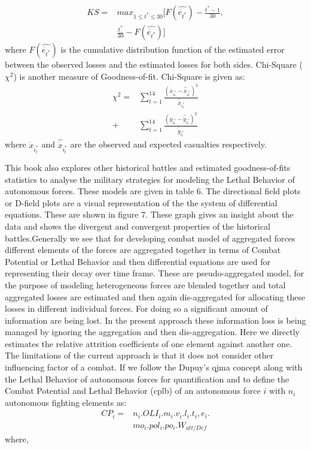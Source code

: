 \documentclass[]{article}
\begin{document}
\begin{equation}
\begin{split}
KS=&{max}_{1\leq{t^*}\leq30}[F(\hat{\Dot{e_{t^*}}})-\frac{t^*-1}{30},\\
&\frac{t^*}{30}-F(\hat{\Dot{e_{t^*}}})]    
\end{split}
\end{equation}
where $F(\hat{\Dot{e_{t^*}}})$ is the cumulative distribution function of the estimated error between the observed losses and the estimated losses for both sides. Chi-Square  (${\chi}^2$) is another measure of Goodness-of-fit. Chi-Square is given as:
\begin{equation}
\begin{split}
    \chi^2=&\sum_{t=1}^{14}\frac{({\Dot{x}}_{i^{*}_t}-\hat{\Dot{x}}_{i^{*}_t})^2}{\hat{\Dot{x}}_{i^{*}_t}} \\+&\sum_{t=1}^{14}\frac{({\Dot{y}}_{i^{*}_t}-\hat{\Dot{y}}_{i^{*}_t})^2}{\hat{\Dot{y}}_{i^{*}_t}}  
\end{split}
\end{equation}
where ${\Dot{x}}_{i^{*}_t}$ and $\hat{\Dot{x}}_{i^{*}_t}$ are the observed and expected casualties respectively.

This book also explores other historical battles and estimated goodness-of-fits statistics to analyse the military strategies for modeling the Lethal Behavior \autocite{lethalRobots} of autonomous forces. These models are given in table 6. The directional field plots or D-field plots are a visual representation of the the system of differential equations. These are shown in figure 7. These graph gives an insight about the data and shows the divergent and convergent properties of the historical battles.Generally we see that for developing combat model of aggregated forces different elements of the forces are aggregated together in terms of Combat Potential or Lethal Behavior \autocite{lethalRobots} and then differential equations are used for representing their decay over time frame. These are pseudo-aggregated model, for the purpose of modeling heterogeneous forces are blended together and total aggregated losses are estimated and then again dis-aggregated for allocating these losses in different individual forces. For doing so a significant amount of information are being lost. In the present approach these information loss is being managed by ignoring the aggregation and then dis-aggregation. Here we directly estimates the relative attrition coefficients of one element against another one. 
The limitations of the current approach is that it does not consider other influencing factor of a combat. If we follow the Dupuy's \acrshort{qjma} concept along with the Lethal Behavior of autonomous forces \autocite{lethalRobots,Dupuy1975} for quantification and to define the Combat Potential and Lethal Behavior (\acrshort{cplb}) of an autonomous force $i$ with $n_i$ autonomous fighting elements as:
\begin{equation}
\begin{split}
    CP_i=&n_i.OLI_i.m_i.v_i.l_i.t_i,e_i.\\&mo_i.pol_i.po_i.
    W_{att/Def}
\end{split}
\end{equation}
 where,\\
 
\end{document}
